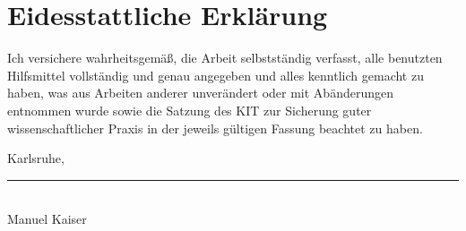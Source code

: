 

\chapter*{Eidesstattliche Erklärung}

Ich versichere wahrheitsgemäß, die Arbeit selbstständig verfasst, alle benutzten Hilfsmittel vollständig und genau angegeben und alles kenntlich gemacht zu haben, was aus Arbeiten anderer unverändert oder mit Abänderungen entnommen wurde sowie die Satzung des KIT zur Sicherung guter wissenschaftlicher Praxis in der jeweils gültigen Fassung beachtet zu haben.\\

\vspace{1cm}

\noindent Karlsruhe, \submissiondate

\vspace{2.5cm}

\noindent\rule{5cm}{0.4pt} \\
Manuel Kaiser \\